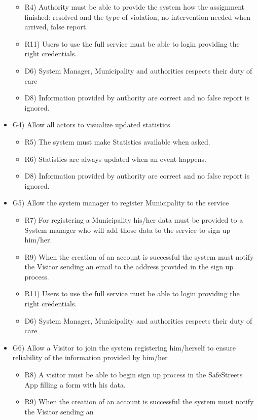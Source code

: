 \begin{itemize}
\begin{itemize}
 \item R4) Authority must be able to provide the system how the assignment finished: resolved and the
type of violation, no intervention needed when arrived, false report.
 \item R11) Users to use the full service must be able to login providing the right credentials.
 \item D6) System Manager, Municipality and authorities respects their duty of care
 \item D8) Information provided by authority are correct and no false report is ignored.
\end{itemize}
\item G4) Allow all actors to visualize updated statistics
\begin{itemize}
\item R5) The system must make Statistics available when asked.
\item R6) Statistics are always updated when an event happens.
 \item D8) Information provided by authority are correct and no false report is ignored.
\end{itemize}
\item G5) Allow the system manager to register Municipality to the service
\begin{itemize}
\item R7) For registering a Municipality his/her data must be provided to a System manager who will add those data to the service to sign up him/her.
\item R9) When the creation of an account is successful the system must notify the Visitor sending an email to the address provided in the sign up process.
 \item R11) Users to use the full service must be able to login providing the right credentials.
\item D6) System Manager, Municipality and authorities respects their duty of care
\end{itemize}
\item G6) Allow a Visitor to join the system registering him/herself to ensure reliability of the information provided by him/her
\begin{itemize}
\item R8) A visitor must be able to begin sign up process in the SafeStreets App filling a form with his
data.
\item R9) When the creation of an account is successful the system must notify the Visitor sending an

\end{itemize}
\end{itemize}
